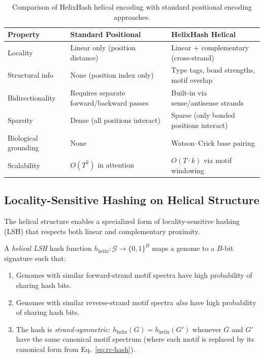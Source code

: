 \begin{table}[H]
\centering
\caption{Comparison of HelixHash helical encoding with standard positional encoding approaches.}
\label{tab:encoding-comparison}
\begin{tabularx}{\textwidth}{L{3cm} Y Y}
\toprule
\textbf{Property} & \textbf{Standard Positional} & \textbf{HelixHash Helical} \\
\midrule
Locality & Linear only (position distance) & Linear + complementary (cross-strand) \\
Structural info & None (position index only) & Type tags, bond strengths, motif overlap \\
Bidirectionality & Requires separate forward/backward passes & Built-in via sense/antisense strands \\
Sparsity & Dense (all positions interact) & Sparse (only bonded positions interact) \\
Biological grounding & None & Watson--Crick base pairing \\
Scalability & $O(T^2)$ in attention & $O(T \cdot k)$ via motif windowing \\
\bottomrule
\end{tabularx}
\end{table}

\subsection{Locality-Sensitive Hashing on Helical Structure}
\label{subsec:lsh-helical}

The helical structure enables a specialized form of locality-sensitive hashing (LSH) that respects both linear and complementary proximity.

\begin{definition}
\label{def:helical-lsh}
A \emph{helical LSH} hash function $h_{\text{helix}}: \mathcal{G} \to \{0, 1\}^B$ maps a genome to a $B$-bit signature such that:
\begin{enumerate}[leftmargin=1.5em]
  \item Genomes with similar forward-strand motif spectra have high probability of sharing hash bits.
  \item Genomes with similar reverse-strand motif spectra \emph{also} have high probability of sharing hash bits.
  \item The hash is \emph{strand-symmetric}: $h_{\text{helix}}(G) = h_{\text{helix}}(G')$ whenever $G$ and $G'$ have the same canonical motif spectrum (where each motif is replaced by its canonical form from Eq.~\ref{eq:rc-hash}).
\end{enumerate}
\end{definition}


